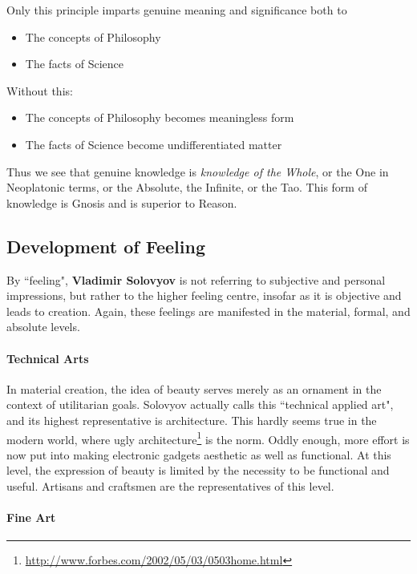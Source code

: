 \begin{quotex}
Only this principle imparts genuine meaning and significance both to

\begin{itemize}
\item The concepts of Philosophy
\item The facts of Science 
\end{itemize}

Without this:

\begin{itemize}
\item The concepts of Philosophy becomes meaningless form 
\item The facts of Science become undifferentiated matter
\end{itemize}
\end{quotex}

Thus we see that genuine knowledge is \emph{knowledge of the Whole}, or the One in Neoplatonic terms, or the Absolute, the Infinite, or the Tao. This form of knowledge is Gnosis and is superior to Reason.

\subsection{Development of Feeling}

By ``feeling", \textbf{Vladimir Solovyov} is not referring to subjective and personal impressions, but rather to the higher feeling centre, insofar as it is objective and leads to creation. Again, these feelings are manifested in the material, formal, and absolute levels.

\paragraph{Technical Arts}
In material creation, the idea of beauty serves merely as an ornament in the context of utilitarian goals. Solovyov actually calls this ``technical applied art", and its highest representative is architecture. This hardly seems true in the modern world, where ugly architecture\footnote{\url{http://www.forbes.com/2002/05/03/0503home.html}} is the norm. Oddly enough, more effort is now put into making electronic gadgets aesthetic as well as functional. At this level, the expression of beauty is limited by the necessity to be functional and useful. Artisans and craftsmen are the representatives of this level.

\paragraph{Fine Art}

